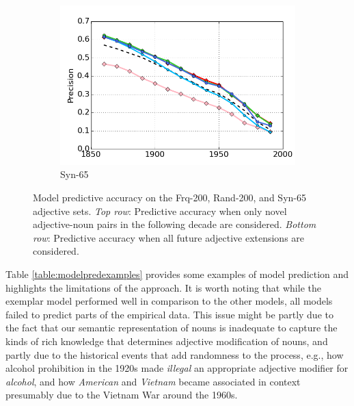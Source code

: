 \documentclass[output=paper]{langsci/langscibook}
\begin{document}
\begin{figure}[t]
\begin{subfigure}{.32\textwidth}
  \includegraphics[width=.98\linewidth]{figures/GREWAL_precision_syn65_future.png}
  \caption{\sc Syn-65}
\end{subfigure}
\caption{Model predictive accuracy on the {\sc Frq-200}, {\sc Rand-200}, and {\sc Syn-65} adjective sets.
{\it Top row}: Predictive accuracy when only novel adjective-noun pairs in the following decade are considered.
{\it Bottom row}: Predictive accuracy when all future adjective extensions are considered.}
\label{fig:accuracy}
\end{figure}


Table \ref{table:modelpredexamples} provides some examples of model prediction and highlights the limitations of the approach. It is worth noting that while the exemplar model performed well in comparison to the other models, all models failed to predict parts of the empirical data. This issue might be partly due to the fact that our semantic representation of nouns is inadequate to capture the kinds of rich knowledge that determines adjective modification of nouns, and partly due to the historical events that add randomness to the process, e.g., how alcohol prohibition in the 1920s made {\it illegal} an appropriate adjective modifier for {\it alcohol}, and how {\it American} and {\it Vietnam} became associated in context presumably due to the Vietnam War around the 1960s.
\end{document}
